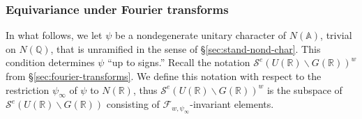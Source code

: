 \documentclass[reqno]{amsart}
\theoremstyle{plain} \newtheorem{theorem} {Theorem}
\theoremstyle{definition} \newtheorem{definition} [theorem] {Definition}
\theoremstyle{itplain} %
\numberwithin{equation}{section}
\numberwithin{theorem}{section}
\begin{document}
\subsubsection{Equivariance under Fourier transforms}
In what follows, we let $\psi$ be a nondegenerate unitary character of $N(\mathbb{A})$, trivial on $N(\mathbb{Q})$, that is unramified in the sense of \S\ref{sec:stand-nond-char}.  This condition determines $\psi$ ``up to signs.''  Recall the notation $\mathcal{S}^e(U(\mathbb{R}) \backslash G(\mathbb{R}))^w$ from \S\ref{sec:fourier-transforms}.  We define this notation with respect to the restriction $\psi_{\infty}$ of $\psi$ to $N(\mathbb{R})$, thus $\mathcal{S}^e(U(\mathbb{R}) \backslash G(\mathbb{R}))^w$ is the subspace of $\mathcal{S}^e(U(\mathbb{R}) \backslash G(\mathbb{R}))$  consisting of $\mathcal{F}_{w,\psi_\infty}$-invariant elements.
\end{document}

